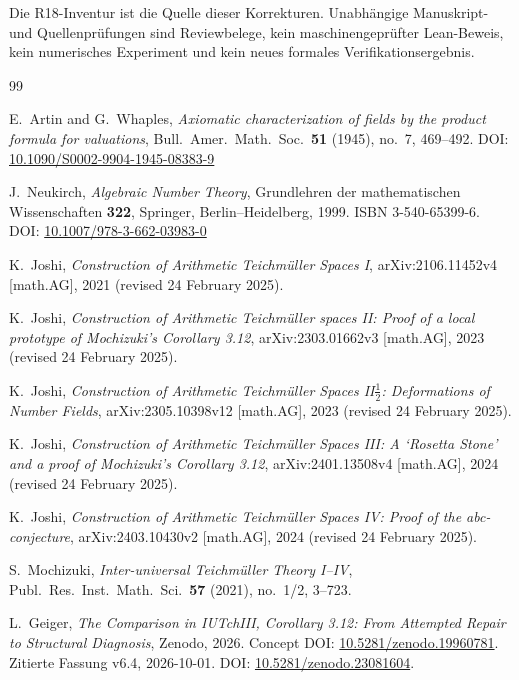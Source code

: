 \documentclass[11pt,a4paper]{article}
\theoremstyle{definition}
\theoremstyle{remark}
\begin{document}
Die R18-Inventur ist die Quelle dieser Korrekturen.
Unabhängige Manuskript- und Quellenprüfungen sind Reviewbelege, kein
maschinengeprüfter Lean-Beweis, kein numerisches Experiment und kein
neues formales Verifikationsergebnis.



\begin{thebibliography}{99}
\raggedright

E.~Artin and G.~Whaples,
\emph{Axiomatic characterization of fields by the product formula for
valuations},
Bull.\ Amer.\ Math.\ Soc.\ \textbf{51} (1945), no.~7, 469--492.
DOI: \href{https://doi.org/10.1090/S0002-9904-1945-08383-9}{10.1090/S0002-9904-1945-08383-9}

J.~Neukirch,
\emph{Algebraic Number Theory},
Grundlehren der mathematischen Wissenschaften \textbf{322},
Springer, Berlin--Heidelberg, 1999.
ISBN 3-540-65399-6. DOI: \href{https://doi.org/10.1007/978-3-662-03983-0}{10.1007/978-3-662-03983-0}

K.~Joshi,
\emph{Construction of Arithmetic Teichmüller Spaces I},
arXiv:2106.11452v4 [math.AG], 2021 (revised 24 February 2025).

K.~Joshi,
\emph{Construction of Arithmetic Teichmüller spaces II: Proof of a local
prototype of Mochizuki's Corollary 3.12},
arXiv:2303.01662v3 [math.AG], 2023 (revised 24 February 2025).

K.~Joshi,
\emph{Construction of Arithmetic Teichmüller Spaces II$\frac{1}{2}$:
Deformations of Number Fields},
arXiv:2305.10398v12 [math.AG], 2023 (revised 24 February 2025).

K.~Joshi,
\emph{Construction of Arithmetic Teichmüller Spaces III: A `Rosetta Stone'
and a proof of Mochizuki's Corollary 3.12},
arXiv:2401.13508v4 [math.AG], 2024 (revised 24 February 2025).

K.~Joshi,
\emph{Construction of Arithmetic Teichmüller Spaces IV: Proof of the
abc-conjecture},
arXiv:2403.10430v2 [math.AG], 2024 (revised 24 February 2025).

S.~Mochizuki,
\emph{Inter-universal Teichmüller Theory I--IV},
Publ.\ Res.\ Inst.\ Math.\ Sci.\ \textbf{57} (2021), no.~1/2, 3--723.

L.~Geiger,
\emph{The Comparison in IUTchIII, Corollary 3.12: From Attempted Repair to Structural Diagnosis},
Zenodo, 2026.
Concept DOI: \href{https://doi.org/10.5281/zenodo.19960781}{10.5281/zenodo.19960781}.
Zitierte Fassung v6.4, 2026-10-01.
DOI: \href{https://doi.org/10.5281/zenodo.23081604}{10.5281/zenodo.23081604}.


\end{thebibliography}
\end{document}
